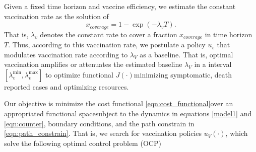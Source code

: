 Given a fixed time horizon and vaccine efficiency, 
we estimate the constant vaccination rate as the solution of
\begin{equation}
    x_{coverage} = 1 - \exp(-\lambda_v T).
\end{equation}
 That is, $\lambda_v$ denotes the constant rate
to cover  a fraction $x_{coverage}$ in time horizon $T$. 
Thus, according to this vaccination rate, we postulate a policy $u_v$ that 
modulates vaccination rate according to $\lambda_V$ as a baseline. That is,
optimal vaccination amplifies or attenuates the estimated baseline 
$\lambda_V$ in a interval $[\lambda_v^{\min}, \lambda_v^{\max}]$ 
to optimize functional $J(\cdot)$\textemdash minimizing 
symptomatic, death reported cases and optimizing resources.

    Our objective is minimize the cost functional
  \eqref{eqn:cost_functional}\textemdash over an appropriated functional
  space\textemdash subject to the dynamics in equations \eqref{model1} and \eqref{eqn:counter},
  boundary conditions, and the path constrain in \eqref{eqn:path_constrain}.
  That is, we search for vaccination policies $u_V(\cdot)$, which
  solve the following optimal control problem (OCP)
